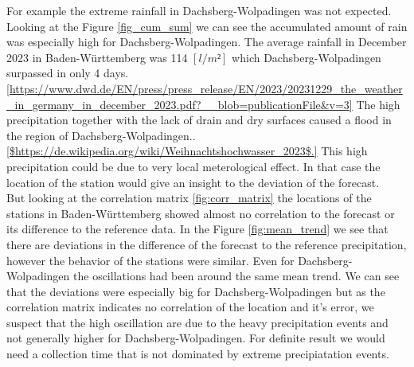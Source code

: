 \documentclass{article}
\theoremstyle{plain}
\theoremstyle{definition}
\theoremstyle{remark}
\begin{document}
For example the extreme rainfall in Dachsberg-Wolpadingen was not expected. Looking at the Figure \ref{fig_cum_sum} we can see the accumulated amount of rain was especially high for Dachsberg-Wolpadingen. The average rainfall in December 2023 in Baden-Württemberg was 114 $[l/m²]$ which Dachsberg-Wolpadingen surpassed in only 4 days.\ref{https://www.dwd.de/EN/press/press_release/EN/2023/20231229_the_weather_in_germany_in_december_2023.pdf?__blob=publicationFile&v=3}  %
The high precipitation together with the lack of drain and dry surfaces caused a flood in the region of Dachsberg-Wolpadingen..\ref{$https://de.wikipedia.org/wiki/Weihnachtshochwasser_2023$.}  %
This high precipitation could be due to very local meterological effect. In that case the location of the station would give an insight to the deviation of the forecast.\\  

But looking at the correlation matrix \ref{fig:corr_matrix} the locations of the stations in Baden-Württemberg showed almost no correlation to the forecast or its difference to the reference data. 
In the Figure \ref{fig:mean_trend} we see that there are deviations in the difference of the forecast to the reference precipitation, however the behavior of the stations were similar. 
Even for Dachsberg-Wolpadingen the oscillations had been around the same mean trend.  %
We can see that the deviations were especially big for Dachsberg-Wolpadingen but as the correlation matrix indicates no correlation of the location and it's error, we suspect that the high oscillation are due to the heavy precipitation events and not generally higher for Dachsberg-Wolpadingen. For definite result we would need a collection time that is not dominated by extreme precipiatation events.\\  %
\end{document}
